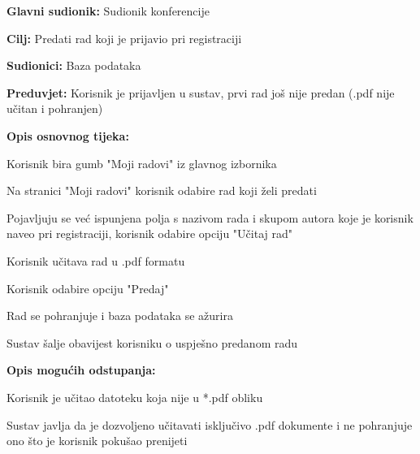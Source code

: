 				
					\noindent {}
					\begin{packed_item}
	
						\item \textbf{Glavni sudionik: } Sudionik konferencije
						\item  \textbf{Cilj:} Predati rad koji je prijavio pri registraciji
						\item  \textbf{Sudionici:} Baza podataka
						\item  \textbf{Preduvjet:} Korisnik je prijavljen u sustav, prvi rad još nije predan (.pdf nije učitan i pohranjen)
						\item  \textbf{Opis osnovnog tijeka:}
						
						\item[] \begin{packed_enum}

							\item Korisnik bira gumb "Moji radovi" iz glavnog izbornika
							\item Na stranici "Moji radovi" korisnik odabire rad koji želi predati
							\item Pojavljuju se već ispunjena polja s nazivom rada i skupom autora koje je korisnik naveo pri registraciji, korisnik odabire opciju "Učitaj rad"
							\item Korisnik učitava rad u .pdf formatu
							\item Korisnik odabire opciju "Predaj"
							\item Rad se pohranjuje i baza podataka se ažurira
							\item Sustav šalje obavijest korisniku o uspješno predanom radu

					
						\end{packed_enum}

						\item  \textbf{Opis mogućih odstupanja:}
						
						\item[] \begin{packed_item}
	
							\item[4.a]  Korisnik je učitao datoteku koja nije u *.pdf obliku
							\item[] \begin{packed_enum}
								
								\item Sustav javlja da je dozvoljeno učitavati isključivo .pdf dokumente i ne pohranjuje ono što je korisnik pokušao prenijeti
								

\end{packed_enum}
\end{packed_item}
\end{packed_item}
